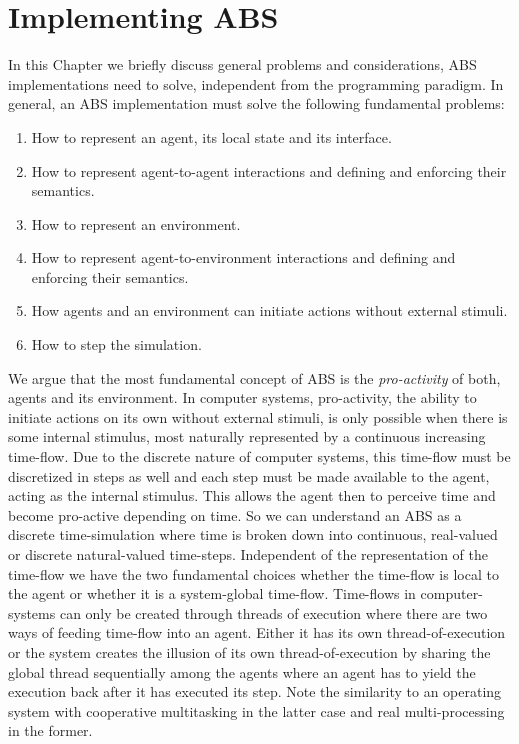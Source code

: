 \chapter{Implementing ABS}
\label{ch:impl_abs}

In this Chapter we briefly discuss general problems and considerations, ABS implementations need to solve, independent from the programming paradigm. In general, an ABS implementation must solve the following fundamental problems:

\begin{enumerate}
	\item How to represent an agent, its local state and its interface.
	\item How to represent agent-to-agent interactions and defining and enforcing their semantics.
	\item How to represent an environment.
	\item How to represent agent-to-environment interactions and defining and enforcing their semantics.
	\item How agents and an environment can initiate actions without external stimuli.
	\item How to step the simulation.
\end{enumerate}

We argue that the most fundamental concept of ABS is the \textit{pro-activity} of both, agents and its environment. In computer systems, pro-activity, the ability to initiate actions on its own without external stimuli, is only possible when there is some internal stimulus, most naturally represented by a continuous increasing time-flow. Due to the discrete nature of computer systems, this time-flow must be discretized in steps as well and each step must be made available to the agent, acting as the internal stimulus. This allows the agent then to perceive time and become pro-active depending on time. So we can understand an ABS as a discrete time-simulation where time is broken down into continuous, real-valued or discrete natural-valued time-steps. Independent of the representation of the time-flow we have the two fundamental choices whether the time-flow is local to the agent or whether it is a system-global time-flow. Time-flows in computer-systems can only be created through threads of execution where there are two ways of feeding time-flow into an agent. Either it has its own thread-of-execution or the system creates the illusion of its own thread-of-execution by sharing the global thread sequentially among the agents where an agent has to yield the execution back after it has executed its step. Note the similarity to an operating system with cooperative multitasking in the latter case and real multi-processing in the former.

